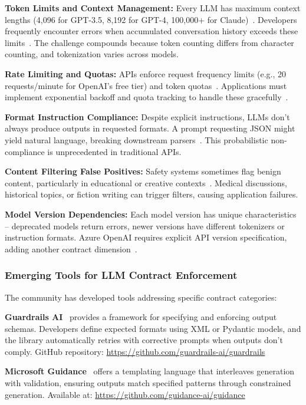 \documentclass[11pt]{article}
\begin{document}
\textbf{Token Limits and Context Management:} Every LLM has maximum context lengths (4,096 for GPT-3.5, 8,192 for GPT-4, 100,000+ for Claude)~\cite{openai2023docs, anthropic2023docs}. Developers frequently encounter errors when accumulated conversation history exceeds these limits~\cite{githublangchain11405}. The challenge compounds because token counting differs from character counting, and tokenization varies across models.

\textbf{Rate Limiting and Quotas:} APIs enforce request frequency limits (e.g., 20 requests/minute for OpenAI's free tier) and token quotas~\cite{openai2023ratelimits}. Applications must implement exponential backoff and quota tracking to handle these gracefully~\cite{stackoverflow78548625}.

\textbf{Format Instruction Compliance:} Despite explicit instructions, LLMs don't always produce outputs in requested formats. A prompt requesting JSON might yield natural language, breaking downstream parsers~\cite{stackoverflow77606776}. This probabilistic non-compliance is unprecedented in traditional APIs.

\textbf{Content Filtering False Positives:} Safety systems sometimes flag benign content, particularly in educational or creative contexts~\cite{openai2023moderation}. Medical discussions, historical topics, or fiction writing can trigger filters, causing application failures.

\textbf{Model Version Dependencies:} Each model version has unique characteristics -- deprecated models return errors, newer versions have different tokenizers or instruction formats. Azure OpenAI requires explicit API version specification, adding another contract dimension~\cite{azureopenai2023}.

\subsubsection{Emerging Tools for LLM Contract Enforcement}

The community has developed tools addressing specific contract categories:

\textbf{Guardrails AI}~\cite{guardrails2023} provides a framework for specifying and enforcing output schemas. Developers define expected formats using XML or Pydantic models, and the library automatically retries with corrective prompts when outputs don't comply. GitHub repository: \url{https://github.com/guardrails-ai/guardrails}

\textbf{Microsoft Guidance}~\cite{guidance2023} offers a templating language that interleaves generation with validation, ensuring outputs match specified patterns through constrained generation. Available at: \url{https://github.com/guidance-ai/guidance}
\end{document}
